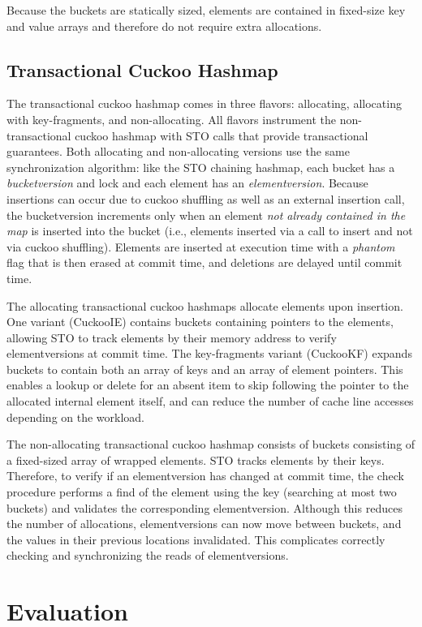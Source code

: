 Because the buckets are statically sized, elements are contained in fixed-size key and value arrays and therefore do not require extra allocations.

\subsection{Transactional Cuckoo Hashmap}
The transactional cuckoo hashmap comes in three flavors: allocating, allocating with key-fragments, and non-allocating. All flavors instrument the non-transactional cuckoo hashmap with STO calls that provide transactional guarantees.
Both allocating and non-allocating versions use the same synchronization algorithm: like the STO chaining hashmap, each bucket has a \emph{bucketversion} and lock and each element has an \emph{elementversion}. Because insertions can occur due to cuckoo shuffling as well as an external insertion call, the bucketversion increments only when an element \emph{not already contained in the map} is inserted into the bucket (i.e., elements inserted via a call to insert and not via cuckoo shuffling). Elements are inserted at execution time with a \emph{phantom} flag that is then erased at commit time, and deletions are delayed until commit time.

The allocating transactional cuckoo hashmaps allocate elements upon insertion. One variant (CuckooIE) contains buckets containing pointers to the elements, allowing STO to track elements by their memory address to verify elementversions at commit time. The key-fragments variant (CuckooKF) expands buckets to contain both an array of keys and an array of element pointers. This enables a lookup or delete for an absent item to skip following the pointer to the allocated internal element itself, and can reduce the number of cache line accesses depending on the workload.

The non-allocating transactional cuckoo hashmap consists of buckets consisting of a fixed-sized array of wrapped elements. STO tracks elements by their keys. Therefore, to verify if an elementversion has changed at commit time, the check procedure performs a find of the element using the key (searching at most two buckets) and validates the corresponding elementversion. Although this reduces the number of allocations, elementversions can now move between buckets, and the values in their previous locations invalidated. This complicates correctly checking and synchronizing the reads of elementversions.

\section{Evaluation}

